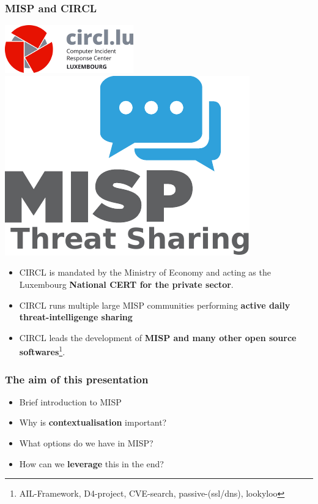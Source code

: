 
\begin{frame}
\titlepage
\end{frame}

\begin{frame}
  \frametitle{MISP and CIRCL}
  \begin{center}
    \includegraphics[scale=0.45]{pics/circl.png}
    \hspace{2.5em}
    \includegraphics[scale=0.35]{pics/misp.pdf}
  \end{center}
  \begin{itemize}
    \item CIRCL is mandated by the Ministry of Economy and acting as the Luxembourg {\bf National CERT for the private sector}. 
    \item CIRCL runs multiple large MISP communities performing {\bf active daily threat-intelligenge sharing}
    \item CIRCL leads the development of {\bf MISP and many other open source softwares}\footnote{AIL-Framework, D4-project, CVE-search, passive-(ssl/dns), lookyloo}.
  \end{itemize}
\end{frame}

\begin{frame}
  \frametitle{The aim of this presentation}
  \begin{itemize}
     \item Brief introduction to MISP
     \item Why is {\bf contextualisation} important?
     \item What options do we have in MISP?
     \item How can we {\bf leverage} this in the end?
  \end{itemize}
\end{frame}


